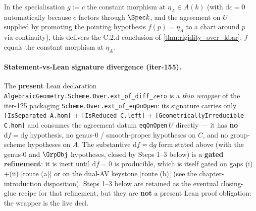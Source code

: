 \begin{theorem}
  In the specialisation \(g := c\) the constant morphism at \(\eta_A \in A(k)\) (with \(\mathrm dc = 0\) automatically because \(c\) factors through \(\Spec k\), and the agreement on \(U\) supplied by promoting the pointing hypothesis \(f(p) = \eta_A\) to a chart around \(p\) via continuity), this delivers the C.2.d conclusion of \cref{thm:rigidity_over_kbar}: \(f\) equals the constant morphism at \(\eta_A\).

  \paragraph{Statement-vs-Lean signature divergence (iter-155).} The \textbf{present} Lean declaration \texttt{AlgebraicGeometry.Scheme.Over.ext\_of\_diff\_zero} is a \emph{thin wrapper} of the iter-125 packaging \texttt{Scheme.Over.ext\_of\_eqOnOpen}: its signature carries only \texttt{[IsSeparated A.hom]} \(+\) \texttt{[IsReduced C.left]} \(+\) \texttt{[GeometricallyIrreducible C.hom]} and consumes the agreement datum \texttt{eqOnOpen}\,\(U\) directly --- it has \textbf{no} \(\mathrm df = \mathrm dg\) hypothesis, no genus-\(0\) / smooth-proper hypotheses on \(C\), and no group-scheme hypotheses on \(A\). The substantive \(\mathrm df = \mathrm dg\) form stated above (with the genus-\(0\) and \(\GrpObj\) hypotheses, closed by Steps 1--3 below) is a \textbf{gated refinement}: it is inert until \(\mathrm df = 0\) is producible, which is itself gated on gaps (i)\(+\)(ii) [route (a)] or on the dual-AV keystone [route (b)] (see the chapter-introduction disposition). Steps 1--3 below are retained as the eventual closing-glue recipe for that refinement, but they are \textbf{not} a present Lean proof obligation: the wrapper is the live decl.
\end{theorem}

